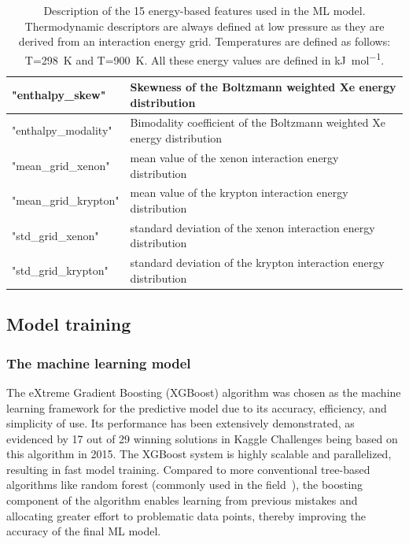 \documentclass[main]{subfiles}
\begin{document}
\begin{table}[ht]
\begin{tabular}{|l|m{10cm}|}
  \hline
  "enthalpy\_skew"  & Skewness of the Boltzmann weighted Xe energy distribution \\
  \hline
  "enthalpy\_modality"  & Bimodality coefficient of the Boltzmann weighted Xe energy distribution \\
  \hline
  "mean\_grid\_xenon"  & mean value of the xenon interaction energy distribution \\
  \hline
  "mean\_grid\_krypton"  & mean value of the krypton interaction energy distribution \\
  \hline
  "std\_grid\_xenon"  & standard deviation of the xenon interaction energy distribution \\
  \hline
  "std\_grid\_krypton"  & standard deviation of the krypton interaction energy distribution \\
  \hline
  \end{tabular}
  \caption{Description of the 15 energy-based features used in the ML model. Thermodynamic descriptors are always defined at low pressure as they are derived from an interaction energy grid. Temperatures are defined as follows: T=298~\si{\kelvin} and T=900~\si{\kelvin}. All these energy values are defined in \si{\kilo\joule\per\mole}.}\label{tab:energy_descriptors}
  \end{table}
  
  \clearpage

\subsection{Model training}

\subsubsection{The machine learning model}

The eXtreme Gradient Boosting (XGBoost) algorithm was chosen as the machine learning framework for the predictive model due to its accuracy, efficiency, and simplicity of use. Its performance has been extensively demonstrated, as evidenced by 17 out of 29 winning solutions in Kaggle Challenges being based on this algorithm in 2015. The XGBoost system is highly scalable and parallelized, resulting in fast model training.\autocite{chen2016xgboost} Compared to more conventional tree-based algorithms like random forest (commonly used in the field~\autocite{Simon_2015}), the boosting component of the algorithm enables learning from previous mistakes and allocating greater effort to problematic data points, thereby improving the accuracy of the final ML model.
\end{document}
